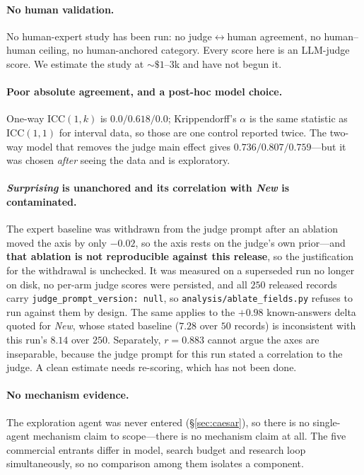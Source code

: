 \paragraph{No human validation.} No human-expert study has been run: no
judge$\leftrightarrow$human agreement, no human--human ceiling, no human-anchored category. Every
score here is an LLM-judge score. We estimate the study at ${\sim}\$1$--$3$k and have not begun it.

\paragraph{Poor absolute agreement, and a post-hoc model choice.} One-way $\mathrm{ICC}(1,k)$ is
$0.0/0.618/0.0$; Krippendorff's $\alpha$ is the same statistic as $\mathrm{ICC}(1,1)$ for interval
data, so those are one control reported twice. The two-way model that removes the judge main effect
gives $0.736/0.807/0.759$---but it was chosen \emph{after} seeing the data and is exploratory.

\paragraph{\emph{Surprising} is unanchored and its correlation with \emph{New} is contaminated.} The
expert baseline was withdrawn from the judge prompt after an ablation moved the axis by only $-0.02$,
so the axis rests on the judge's own prior---and \textbf{that ablation is not reproducible against this
release}, so the justification for the withdrawal is unchecked. It was measured on a superseded run no
longer on disk, no per-arm judge scores were persisted, and all $250$ released records carry
\texttt{judge\_prompt\_version: null}, so \texttt{analysis/ablate\_fields.py} refuses to run against
them by design. The same applies to the $+0.98$ known-answers delta quoted for \emph{New}, whose stated
baseline ($7.28$ over $50$ records) is inconsistent with this run's $8.14$ over $250$. Separately, $r =
0.883$ cannot argue the axes are inseparable, because the judge prompt for this run stated a
correlation to the judge. A clean estimate needs re-scoring, which has not been done.

\paragraph{No mechanism evidence.} The exploration agent was never entered
(\S\ref{sec:caesar}), so there is no single-agent mechanism claim to scope---there is no mechanism
claim at all. The five commercial entrants differ in model, search budget and research loop
simultaneously, so no comparison among them isolates a component.

